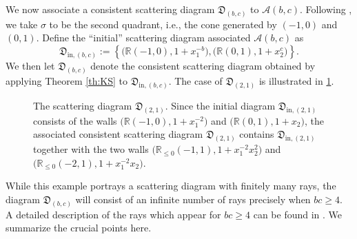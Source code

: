 \documentclass[11pt]{amsart}
\newcommand{\sayDR}[1]{\say[DR]{#1}}
\theoremstyle{remark}
\newtheorem{example}[theorem]{Example}
\numberwithin{equation}{section}
\newcommand{\RR}{\mathbb{R}}
\newcommand{\cA}{\mathcal{A}}
\newcommand{\fD}{\mathfrak{D}}
\begin{document}
We now associate a consistent scattering diagram $\fD_{(b,c)}$ to 
$\cA(b,c)$.  Following \cite[Example~1.30]{GHKK}, we take $\sigma$ to be the second quadrant, i.e., the cone generated by $(-1,0)$ and
$(0,1)$. Define the ``initial'' scattering diagram associated $\cA(b,c)$ as
\[
  \fD_{\mathrm{in},(b,c)} := 
  \left\{
    \big( \RR (-1,0), 1+x_1^{-b}\big), 
    \big( \RR (0,1), 1+x_2^c\big) 
  \right\}.
\]
We then let $\fD_{(b,c)}$ denote the consistent scattering diagram obtained by
applying Theorem \ref{th:KS} to $\fD_{\mathrm{in},(b,c)}$.  The case of $\fD_{(2,1)}$ is illustrated in \cref{fig:diagex}.


\begin{figure}
  \centering
  \caption{The scattering diagram $\fD_{(2,1)}$.  Since the initial diagram $\fD_{\mathrm{in},(2,1)}$ consists of the walls $\big(\RR(-1,0),\allowbreak 1+x_1^{-2}\big)$ and $\big(\RR (0,1), 1+x_2\big)$,
  the associated consistent scattering diagram $\fD_{(2,1)}$ contains $\fD_{\mathrm{in},(2,1)}$ together with
  the two walls $\big(\RR_{\leq 0} (-1,1), 1+x_1^{-2}x_2^2 \big)$ and $\big( \RR_{\leq 0} (-2,1), 1+x_1^{-2}x_2 \big)$.
} 
  \label{fig:diagex}
\end{figure}

While this example portrays a scattering diagram with finitely many rays, the diagram $\fD_{(b,c)}$ will consist of an infinite number of rays precisely when $bc\ge 4$. A detailed description of the rays
which appear for $bc\ge4$ can be found in \cite[Example 1.30]{GHKK}.
We summarize the crucial points here.
\end{document}
